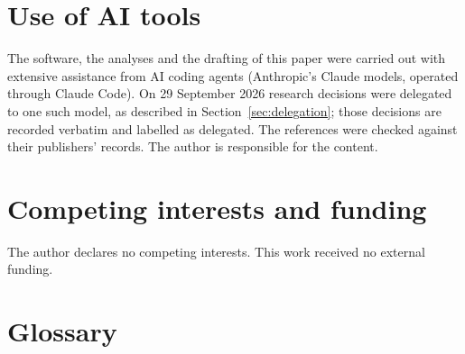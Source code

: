 \documentclass[11pt]{article}
\begin{document}
\section*{Use of AI tools}

The software, the analyses and the drafting of this paper were carried out with extensive assistance
from AI coding agents (Anthropic's Claude models, operated through Claude Code). On 29 September 2026
research decisions were delegated to one such model, as described in Section~\ref{sec:delegation}; those
decisions are recorded verbatim and labelled as delegated. The references were checked against their
publishers' records. The author is responsible for the content.

\section*{Competing interests and funding}

The author declares no competing interests. This work received no external funding.




\clearpage
\appendix

\section{Glossary}\label{app:glossary}
\end{document}
